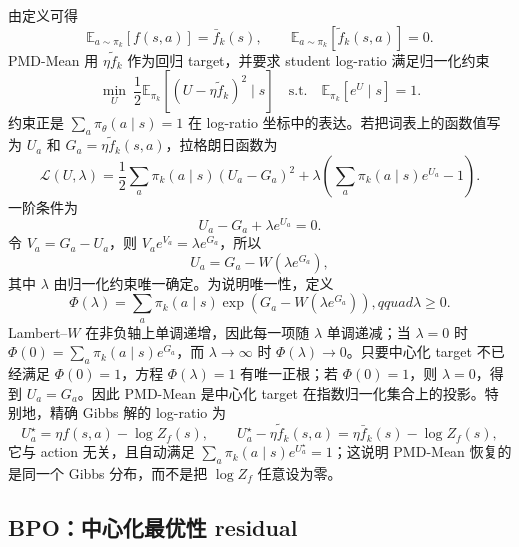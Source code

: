 由定义可得
\[
\mathbb E_{a\sim\pi_k}[f(s,a)]=\bar f_k(s),
\qquad
\mathbb E_{a\sim\pi_k}[\widetilde f_k(s,a)]=0.
\]
PMD-Mean 用 $\eta\widetilde f_k$ 作为回归 target，并要求 student log-ratio 满足归一化约束
\begin{equation}
\label{eq:ch2-mean-loss}
\min_{U}\ \frac12\mathbb E_{\pi_k}\left[(U-\eta\widetilde f_k)^2\mid s\right]
\quad\text{s.t.}\quad
\mathbb E_{\pi_k}[e^{U}\mid s]=1.
\end{equation}
约束正是 $\sum_a\pi_\theta(a\mid s)=1$ 在 log-ratio 坐标中的表达。若把词表上的函数值写为 $U_a$ 和 $G_a=\eta\widetilde f_k(s,a)$，拉格朗日函数为
\[
\mathscr L(U,\lambda)
=\frac12\sum_a\pi_k(a\mid s)(U_a-G_a)^2
+\lambda\left(\sum_a\pi_k(a\mid s)e^{U_a}-1\right).
\]
一阶条件为
\[
U_a-G_a+\lambda e^{U_a}=0.
\]
令 $V_a=G_a-U_a$，则 $V_a e^{V_a}=\lambda e^{G_a}$，所以
\begin{equation}
\label{eq:ch2-mean-lambert}
U_a=G_a-W\!\left(\lambda e^{G_a}\right),
\end{equation}
其中 $\lambda$ 由归一化约束唯一确定。为说明唯一性，定义
\[
\Phi(\lambda)=\sum_a\pi_k(a\mid s)\exp\!\left(G_a-W(\lambda e^{G_a})\right),qquad \lambda\geq0.
\]
Lambert--$W$ 在非负轴上单调递增，因此每一项随 $\lambda$ 单调递减；当 $\lambda=0$ 时 $\Phi(0)=\sum_a\pi_k(a\mid s)e^{G_a}$，而 $\lambda\to\infty$ 时 $\Phi(\lambda)\to0$。只要中心化 target 不已经满足 $\Phi(0)=1$，方程 $\Phi(\lambda)=1$ 有唯一正根；若 $\Phi(0)=1$，则 $\lambda=0$，得到 $U_a=G_a$。因此 PMD-Mean 是中心化 target 在指数归一化集合上的投影。特别地，精确 Gibbs 解的 log-ratio 为
\[
U_a^\star=\eta f(s,a)-\log Z_f(s),\qquad
U_a^\star-\eta\widetilde f_k(s,a)=\eta\bar f_k(s)-\log Z_f(s),
\]
它与 action 无关，且自动满足 $\sum_a\pi_k(a\mid s)e^{U_a^\star}=1$；这说明 PMD-Mean 恢复的是同一个 Gibbs 分布，而不是把 $\log Z_f$ 任意设为零。


\subsection{BPO：中心化最优性 residual}
\label{sec:ch2-bpo}

